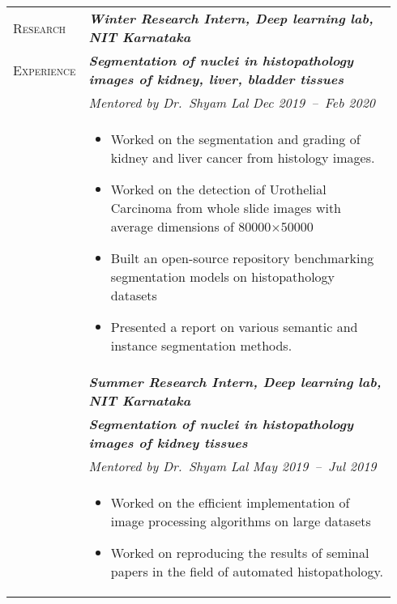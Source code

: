 \documentclass[letterpaper, 10pt, oneside]{article}
\newcommand{\stitle}[1]{\normalsize{\textsc{#1}}}
\newcommand{\bdit}[1]{\textit{\textbf{#1}}}
\begin{document}
\begin{longtable}{@{} p{0.14\linewidth} p{0.8\linewidth}}
\stitle{Research}   & \bdit{Winter Research Intern, Deep learning lab, NIT Karnataka} \\
\stitle{Experience} & \bdit{Segmentation of nuclei in histopathology images of kidney, liver, bladder tissues} \\
                    & \textit{Mentored by Dr.\ Shyam Lal} \hfill \hspace{-3em} \textit{Dec 2019\ --\ Feb 2020} \\
                    & \parbox{0.8\textwidth}{
                        \begin{itemize}[leftmargin=*, itemsep=-0.88ex]
                            \item Worked on the segmentation and grading of kidney and liver cancer from histology images.
                            \item Worked on the detection of Urothelial Carcinoma from whole slide images with average dimensions of 80000$\times$50000 
                            \item Built an open-source repository benchmarking segmentation models on histopathology datasets 
                            \item Presented a report on various semantic and instance segmentation methods.
                        \end{itemize}
                    }
\\
                    & \bdit{Summer Research Intern, Deep learning lab, NIT Karnataka} \\
                    & \bdit{Segmentation of nuclei in histopathology images of kidney tissues} \\
                    & \textit{Mentored by Dr.\ Shyam Lal} \hfill \hspace{-3em} \textit{May 2019\ --\ Jul 2019} \\
                    & \parbox{0.8\textwidth}{
                        \begin{itemize}[leftmargin=*, itemsep=-0.88ex]
                            \item Worked on the efficient implementation of image processing algorithms on large datasets
                            \item Worked on reproducing the results of seminal papers in the field of automated histopathology.
                        \end{itemize}
                    }
\\



\end{longtable}
\end{document}
